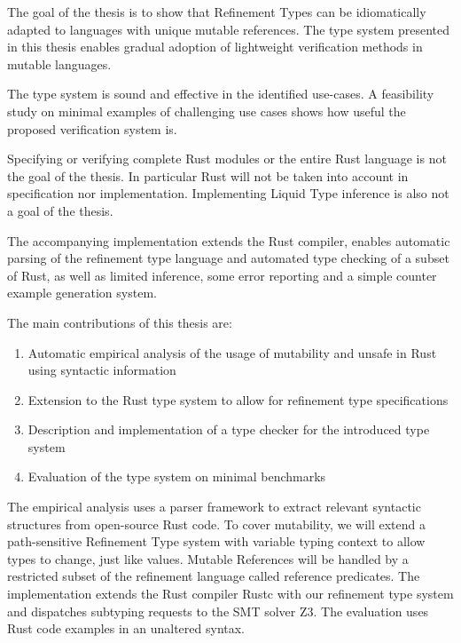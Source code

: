 \documentclass[twoside, english, final]{sdqthesis}
\theoremstyle{definition}
\begin{document}
The goal of the thesis is to show that Refinement Types can be idiomatically adapted to languages with unique mutable references. The type system presented in this thesis enables gradual adoption of lightweight verification methods in mutable languages.

The type system is sound and effective in the identified use-cases.
A feasibility study on minimal examples of challenging use cases shows how useful the proposed verification system is. 

Specifying or verifying complete Rust modules or the entire Rust language is not the goal of the thesis. In particular  Rust will not be taken into account in specification nor implementation. Implementing Liquid Type inference is also not a goal of the thesis.

The accompanying implementation extends the Rust compiler, enables automatic parsing of the refinement type language and automated type checking of a subset of Rust, as well as limited inference, some error reporting and a simple counter example generation system. 

The main contributions of this thesis are:
\begin{enumerate}
  \item Automatic empirical analysis of the usage of mutability and unsafe in Rust using syntactic information
  \item Extension to the Rust type system to allow for refinement type specifications
  \item Description and implementation of a type checker for the introduced type system
  \item Evaluation of the type system on minimal benchmarks
\end{enumerate}

The empirical analysis uses a parser framework to extract relevant syntactic structures from open-source Rust code.
To cover mutability, we will extend a path-sensitive Refinement Type system with variable typing context to allow types to change, just like values. Mutable References will be handled by a restricted subset of the refinement language called reference predicates. The implementation extends the Rust compiler Rustc with our refinement type system and dispatches subtyping requests to the SMT solver Z3. 
The evaluation uses Rust code examples in an unaltered syntax.
\end{document}
